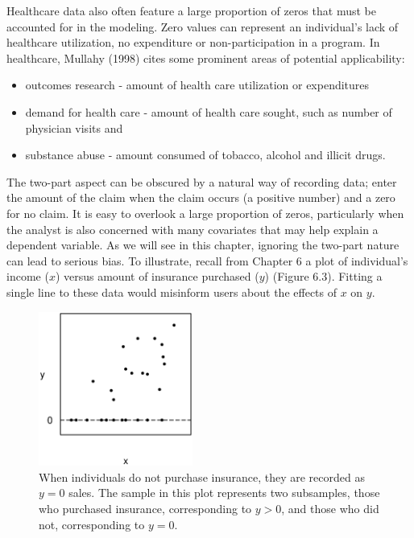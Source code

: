 Healthcare data also often feature a large proportion of zeros that must be
accounted for in the modeling. Zero values can represent an individual's
lack of healthcare utilization, no expenditure or non-participation in a
program. In healthcare, Mullahy (1998) cites some prominent areas of
potential applicability:

\begin{itemize}
\item outcomes research - amount of health care utilization or expenditures

\item demand for health care - amount of health care sought, such as number
of physician visits and

\item substance abuse - amount consumed of tobacco, alcohol and illicit
drugs.
\end{itemize}

The two-part aspect can be obscured by a natural way of recording
data; enter the amount of the claim when the claim occurs (a
positive number) and a zero for no claim. It is easy to overlook a
large proportion of zeros, particularly when the analyst is also
concerned with many covariates that may help explain a dependent
variable. As we will see in this chapter, ignoring the two-part
nature can lead to serious bias. To illustrate, recall from Chapter
6 a plot of individual's income ($x$) versus amount of insurance
purchased ($y$) (Figure 6.3). Fitting a single line to these data
would misinform users about the effects of $x$ on $y$.

\begin{figure}[htp]
    \includegraphics[width=0.45\textwidth]{Chapter6/F6TwoPartZero.eps}
        \caption{\label{F6:TwoPartZero} When individuals do not purchase insurance, they are recorded as $y=0$ sales.
        The sample in this plot represents two subsamples, those who
purchased insurance, corresponding to $y>0$, and those who did not,
corresponding to $y=0$. }
\end{figure}


